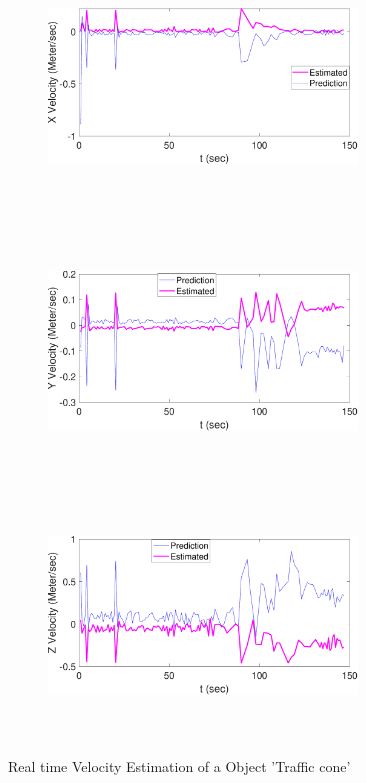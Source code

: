 \begin{figure}
    \centering
    \begin{subfigure}
        \centering
        \includegraphics[height=6.5cm,width=0.9\textwidth]{Images/X_Veltc.pdf}
    \end{subfigure}
    \begin{subfigure}
        \centering
        \includegraphics[height=6.5cm,width=0.9\textwidth]{Images/Y_Veltc.pdf}
    \end{subfigure}
    \begin{subfigure}
        \centering
        \includegraphics[height=6.5cm,width=0.9\textwidth]{Images/Z_Veltc.pdf}
    \end{subfigure}
    \caption{Real time Velocity Estimation of a Object 'Traffic cone'}
    \label{Veloesttc}
\end{figure}


